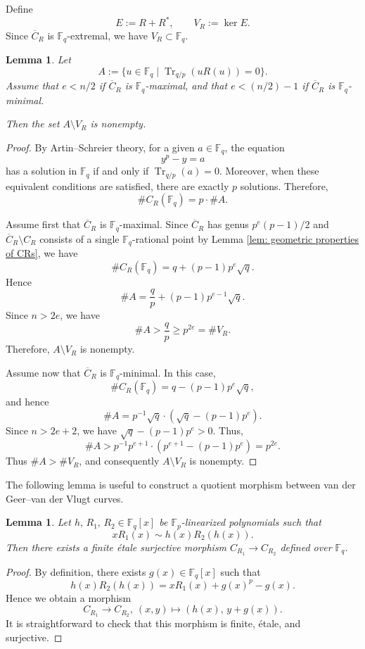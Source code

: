 \documentclass[12pt,a4paper]{amsart}
\newtheorem{lemma}[theorem]{Lemma}
\theoremstyle{definition}
\def\F{{\mathbb F}}
\theoremstyle{remark}
\DeclareMathOperator{\Tr}{Tr}
\begin{document}
Define 
\[
E:=R+R^\ast,\qquad V_R:=\ker E. 
\]
Since $\overline{C}_R$ is $\F_q$-extremal, we have $V_R\subset \F_q$. 
\begin{lemma}\label{lemma: existence of u}
    Let 
    \[
A:=\{u\in \F_q\mid \Tr_{q/p}(uR(u))=0\}. 
\]
Assume that $e<n/2$ if $\overline{C}_R$ is $\F_q$-maximal, and that $e<(n/2)-1$ if $\overline{C}_R$ is $\F_q$-minimal. 

Then the set $A\setminus V_R$ is nonempty. 
\end{lemma}
\begin{proof}
By Artin--Schreier theory, for a given $a\in\F_q$, the equation 
\[
y^p-y=a
\]
has a solution in $\F_q$ if and only if $\Tr_{q/p}(a)=0$. Moreover, when these equivalent conditions are satisfied, there are exactly $p$ solutions. Therefore, 
\[
\# C_R(\F_q)=p\cdot\#A. 
\]

Assume first that $\overline{C}_R$ is $\F_q$-maximal. 
 Since $\overline{C}_R$ has genus $p^e(p-1)/2$ and  $\overline{C}_R\setminus C_R$ consists of a single $\F_q$-rational point by Lemma \ref{lem: geometric properties of CRs}, we have 
\[
\# C_R(\F_q)= q+(p-1)p^e\sqrt{q}. 
\]
Hence
\[
\#A=\frac{q}{p}+(p-1)p^{e-1}\sqrt{q}.
\]
Since $n>2e$, we have
\[
\#A>\frac{q}{p}\ge p^{2e}=\#V_R.
\]
Therefore, $A\setminus V_R$ is nonempty.

 

Assume now that $\overline{C}_R$ is $\F_q$-minimal. In this case, 
\[
\# C_R(\F_q)= q-(p-1)p^e\sqrt{q}, 
\]
and hence 
\[
\# A=p^{-1}\sqrt{q}\cdot(\sqrt{q}-(p-1)p^e). 
\]
Since $n>2e+2$, we have $\sqrt{q}-(p-1)p^e>0$. Thus, 
\[
\# A>p^{-1}p^{e+1}\cdot(p^{e+1}-(p-1)p^e)=p^{2e}. 
\]
Thus $\#A>\#V_R$, and consequently $A\setminus V_R$ is nonempty. 
\end{proof}

The following lemma is useful to construct a quotient morphism between van der Geer--van der Vlugt curves. 
\begin{lemma}\label{abc}
Let $h,\, R_1,\, R_2 \in \F_q[x]$ be  
$\F_p$-linearized polynomials 
such that 
\[x R_1(x) \sim h(x) R_2(h(x)). \]
Then there exists a finite  \'etale  surjective morphism $C_{R_1} \to C_{R_2}$ defined over $\F_q$. 
 \end{lemma}
 \begin{proof}
 By definition, there exists $g(x) \in \F_q[x]$ such 
that 
\[
h(x) R_2(h(x))=x R_1(x)+g(x)^p-g(x). 
\]
Hence we obtain a morphism 
\[
C_{R_1} \to C_{R_2},\ (x,y) \mapsto (h(x),\, y+g(x)). 
\]
It is straightforward to check that this morphism is finite, \'etale, and surjective. 
\end{proof}
\end{document}
